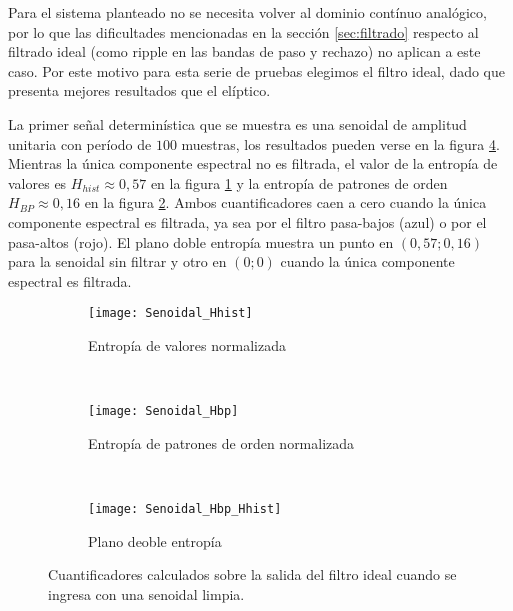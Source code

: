 Para el sistema planteado no se necesita volver al dominio contínuo analógico, por lo que las dificultades mencionadas en la sección \ref{sec:filtrado} respecto al filtrado ideal (como ripple en las bandas de paso y rechazo) no aplican a este caso.
Por este motivo para esta serie de pruebas elegimos el filtro ideal, dado que presenta mejores resultados que el elíptico.

La primer señal determinística que se muestra es una senoidal de amplitud unitaria con período de $100$ muestras, los resultados pueden verse en la figura \ref{fig:Senoidal}.
Mientras la única componente espectral no es filtrada, el valor de la entropía de valores es $H_{hist}\approx0,57$ en la figura \ref{subfig:Senoidal_Hhist} y la entropía de patrones de orden $H_{BP}\approx0,16$ en la figura \ref{subfig:Senoidal_Hbp}.
Ambos cuantificadores caen a cero cuando la única componente espectral es filtrada, ya sea por el filtro pasa-bajos (azul) o por el pasa-altos (rojo).
El plano doble entropía muestra un punto en $\left(0,57;0,16\right)$ para la senoidal sin filtrar y otro en $\left(0;0\right)$ cuando la única componente espectral es filtrada.
%
\begin{figure}[h]
    \centering
    \begin{subfigure}[t]{0.32\textwidth}
        \texttt{[image: Senoidal\_Hhist]}
        \caption{Entropía de valores normalizada}
        \label{subfig:Senoidal_Hhist}
    \end{subfigure}
    ~ %
    \begin{subfigure}[t]{0.32\textwidth}
        \texttt{[image: Senoidal\_Hbp]}
        \caption{Entropía de patrones de orden normalizada}
        \label{subfig:Senoidal_Hbp}
    \end{subfigure}
    ~ %
    \begin{subfigure}[t]{0.32\textwidth}
        \texttt{[image: Senoidal\_Hbp\_Hhist]}
        \caption{Plano deoble entropía}
        \label{subfig:Senoidal_HbpHhist}
    \end{subfigure}
    \caption{Cuantificadores calculados sobre la salida del filtro ideal cuando se ingresa con una senoidal limpia.}\label{fig:Senoidal}
\end{figure}

